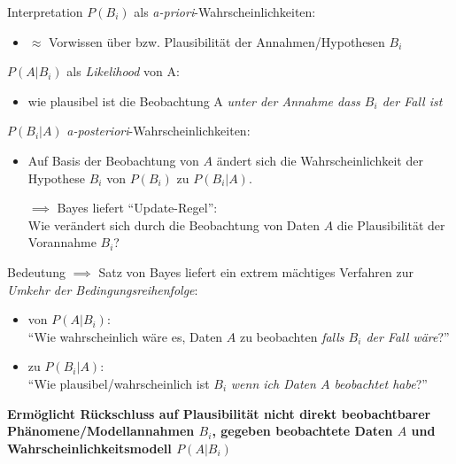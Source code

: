 \documentclass[
  10pt,
  ignorenonframetext,
]{beamer}
\providecommand{\tightlist}{%
  \setlength{\itemsep}{0pt}\setlength{\parskip}{0pt}}
\begin{document}
\begin{frame}{Interpretation}
\label{interpretation}
\(P(B_i)\) als \emph{a-priori}-Wahrscheinlichkeiten:

\begin{itemize}
\tightlist
\item
  \(\approx\) Vorwissen über bzw. Plausibilität der Annahmen/Hypothesen
  \(B_i\)
\end{itemize}

\(P(A|B_i)\) als \emph{Likelihood} von A:

\begin{itemize}
\tightlist
\item
  wie plausibel ist die Beobachtung A \emph{unter der Annahme dass
  \(B_i\) der Fall ist}
\end{itemize}

\(P(B_i|A)\) \emph{a-posteriori}-Wahrscheinlichkeiten:

\begin{itemize}
\item
  Auf Basis der Beobachtung von \(A\) ändert sich die Wahrscheinlichkeit
  der Hypothese \(B_i\) von \(P(B_i)\) zu \(P(B_i|A).\)

  \(\implies\) Bayes liefert ``Update-Regel'':\\
  Wie verändert sich durch die Beobachtung von Daten \(A\) die
  Plausibilität der Vorannahme \(B_i\)?
\end{itemize}
\end{frame}

\begin{frame}{Bedeutung}
\label{bedeutung}
\(\implies\) Satz von Bayes liefert ein extrem mächtiges Verfahren zur\\
\emph{Umkehr der Bedingungsreihenfolge}:

\begin{itemize}
\tightlist
\item
  von \(P(A|B_i)\):\\
  ``Wie wahrscheinlich wäre es, Daten \(A\) zu beobachten \emph{falls
  \(B_i\) der Fall wäre}?''
\item
  zu \(P(B_i|A)\):\\
  ``Wie plausibel/wahrscheinlich ist \(B_i\) \emph{wenn ich Daten \(A\)
  beobachtet habe}?''
\end{itemize}

\textbf{Ermöglicht Rückschluss auf Plausibilität nicht direkt
beobachtbarer Phänomene/Modellannahmen \(B_i\), gegeben beobachtete
Daten \(A\) und Wahrscheinlichkeitsmodell \(P(A|B_i)\)}

\end{frame}
\end{document}

